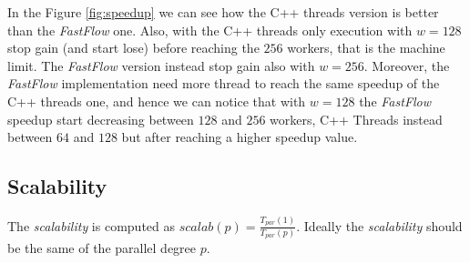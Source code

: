 \bigskip\noindent
In the Figure \ref{fig:speedup} we can see how the C++ threads version is better than the \textit{FastFlow} one. Also, with the C++ threads only execution with $w = 128$ stop gain (and start lose) before reaching the $256$ workers, that is the machine limit. The \textit{FastFlow} version instead stop gain also with $w = 256$. Moreover, the \textit{FastFlow} implementation need more thread to reach the same speedup of the C++ threads one, and hence we can notice that with $w = 128$ the \textit{FastFlow} speedup start decreasing between $128$ and $256$ workers, C++ Threads instead between $64$ and $128$ but after reaching a higher speedup value.



\subsection{Scalability}
The \textit{scalability} is computed as $scalab(p) = \frac{T_{par}(1)}{T_{par}(p)}$. Ideally the \textit{scalability} should be the same of the parallel degree $p$.

